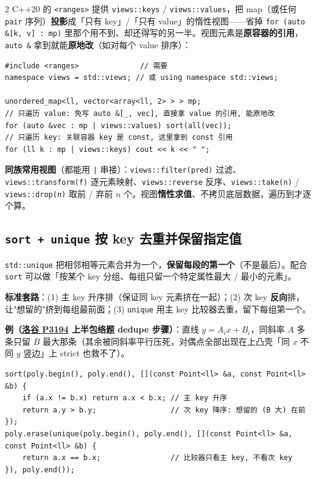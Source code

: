 \begin{multicols*}{2}
		C++20 的 \texttt{<ranges>} 提供 \texttt{views::keys} / \texttt{views::values}，把 map（或任何 \texttt{pair} 序列）\textbf{投影}成「只有 key」/「只有 value」的惰性视图——省掉 \texttt{for (auto \&[k, v] : mp)} 里那个用不到、却还得写的另一半。视图元素是\textbf{原容器的引用}，\texttt{auto \&} 拿到就能\textbf{原地改}（如对每个 value 排序）：

		\begin{verbatim}
#include <ranges>              // 需要
namespace views = std::views; // 或 using namespace std::views;

unordered_map<ll, vector<array<ll, 2> > > mp;
// 只遍历 value: 免写 auto &[_, vec], 直接拿 value 的引用, 能原地改
for (auto &vec : mp | views::values) sort(all(vec));
// 只遍历 key: 关联容器 key 是 const, 这里拿到 const 引用
for (ll k : mp | views::keys) cout << k << " ";
		\end{verbatim}

		\textbf{同族常用视图}（都能用 \texttt{|} 串接）：\texttt{views::filter(pred)} 过滤、\texttt{views::transform(f)} 逐元素映射、\texttt{views::reverse} 反序、\texttt{views::take(n)} / \texttt{views::drop(n)} 取前 / 弃前 \(n\) 个。视图\textbf{惰性求值}、不拷贝底层数据，遍历到才逐个算。

		\subsection{\texttt{sort + unique} 按 key 去重并保留指定值}

		\texttt{std::unique} 把相邻相等元素合并为一个，\textbf{保留每段的第一个}（不是最后）。配合 \texttt{sort} 可以做「按某个 key 分组、每组只留一个特定属性最大 / 最小的元素」。

		\textbf{标准套路}：(1) 主 key 升序排（保证同 key 元素挤在一起）；(2) 次 key \textbf{反向}排，让"想留的"挤到每组最前面；(3) \texttt{unique} 用主 key 比较器去重，留下每组第一个。

		\textbf{例（\href{https://www.luogu.com.cn/problem/P3194}{洛谷 P3194} 上半包络题 dedupe 步骤）}：直线 $y = A_i x + B_i$，同斜率 $A$ 多条只留 $B$ 最大那条（其余被同斜率平行压死，对偶点全部出现在上凸壳「同 $x$ 不同 $y$ 竖边」上 strict 也救不了）。

		\begin{verbatim}
sort(poly.begin(), poly.end(), [](const Point<ll> &a, const Point<ll> &b) {
	if (a.x != b.x) return a.x < b.x; // 主 key 升序
	return a.y > b.y;                 // 次 key 降序: 想留的 (B 大) 在前
});
poly.erase(unique(poly.begin(), poly.end(), [](const Point<ll> &a, const Point<ll> &b) {
	return a.x == b.x;                // 比较器只看主 key, 不看次 key
}), poly.end());
		\end{verbatim}


\end{multicols*}

